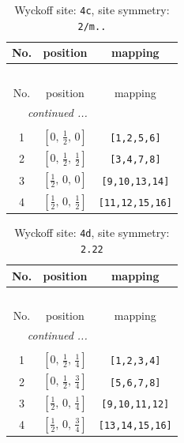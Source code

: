 \documentclass[fleqn,8pt]{jsarticle}
\begin{document}
\renewcommand{\arraystretch}{1.2}
\begin{longtable}{ccc}
\caption{Wyckoff site: {\tt 4c}, site symmetry: {\tt 2/m..}}
 \\
 \hline \hline
No. & position & mapping \\ \hline \endfirsthead

\multicolumn{2}{l}{\tablename\ \thetable{}} \\
 \hline \hline
No. & position & mapping \\ \hline \endhead

 \hline \hline
\multicolumn{2}{r}{\footnotesize\it continued ...} \\ \endfoot

 \hline \hline
\multicolumn{2}{r}{} \\ \endlastfoot

1 & $\left[ 0,\, \frac{1}{2},\, 0 \right]$ & {\tt [1,2,5,6]} \\ \hline
2 & $\left[ 0,\, \frac{1}{2},\, \frac{1}{2} \right]$ & {\tt [3,4,7,8]} \\ \hline
3 & $\left[ \frac{1}{2},\, 0,\, 0 \right]$ & {\tt [9,10,13,14]} \\ \hline
4 & $\left[ \frac{1}{2},\, 0,\, \frac{1}{2} \right]$ & {\tt [11,12,15,16]} \\
\end{longtable}
\renewcommand{\arraystretch}{1.2}
\begin{longtable}{ccc}
\caption{Wyckoff site: {\tt 4d}, site symmetry: {\tt 2.22}}
 \\
 \hline \hline
No. & position & mapping \\ \hline \endfirsthead

\multicolumn{2}{l}{\tablename\ \thetable{}} \\
 \hline \hline
No. & position & mapping \\ \hline \endhead

 \hline \hline
\multicolumn{2}{r}{\footnotesize\it continued ...} \\ \endfoot

 \hline \hline
\multicolumn{2}{r}{} \\ \endlastfoot

1 & $\left[ 0,\, \frac{1}{2},\, \frac{1}{4} \right]$ & {\tt [1,2,3,4]} \\ \hline
2 & $\left[ 0,\, \frac{1}{2},\, \frac{3}{4} \right]$ & {\tt [5,6,7,8]} \\ \hline
3 & $\left[ \frac{1}{2},\, 0,\, \frac{1}{4} \right]$ & {\tt [9,10,11,12]} \\ \hline
4 & $\left[ \frac{1}{2},\, 0,\, \frac{3}{4} \right]$ & {\tt [13,14,15,16]} \\
\end{longtable}
\end{document}
